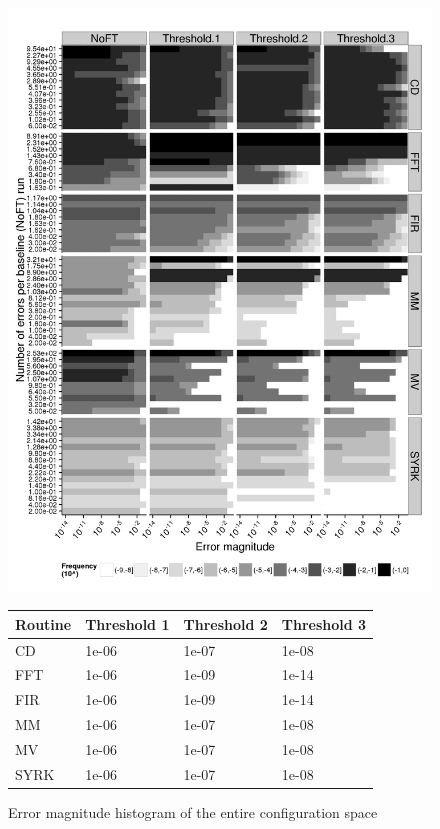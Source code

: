 \documentclass[10pt, conference, compsocconf]{IEEEtran}
\begin{document}
\begin{figure}[ht!]
\centering
\includegraphics[width=1.00\columnwidth]{figs/4_1_1_Exp2_2_Heatmap_Error_ConfSpace.png}
\begin{tabular}{|p{0.5in}|p{0.7in}|p{0.7in}|p{0.7in}|}
\hline
Routine & Threshold 1 & Threshold 2 & Threshold 3 \\
\hline
\hline
CD & 1e-06 & 1e-07 & 1e-08 \\
\hline
FFT & 1e-06 & 1e-09 & 1e-14 \\
\hline
FIR & 1e-06 & 1e-09 & 1e-14 \\
\hline
MM & 1e-06 & 1e-07 & 1e-08 \\
\hline
MV & 1e-06 & 1e-07 & 1e-08 \\
\hline
SYRK & 1e-06 & 1e-07 & 1e-08 \\
\hline
\end{tabular}
\caption{Error magnitude histogram of the entire configuration space}
\label{fig:algo_err_heatmap}
\end{figure}
\end{document}
